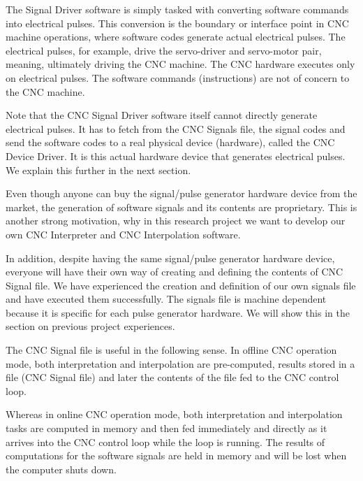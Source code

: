 The Signal Driver software is simply tasked with converting software commands into electrical pulses. This conversion is the boundary or interface point in CNC machine operations, where software codes generate actual electrical pulses. The electrical pulses, for example, drive the servo-driver and servo-motor pair, meaning, ultimately driving the CNC machine. The CNC hardware executes only on electrical pulses. The software commands (instructions) are not of concern to the CNC machine.
\vspace*{1\baselineskip}

Note that the CNC Signal Driver software itself cannot directly generate electrical pulses. It has to fetch from the CNC Signals file, the signal codes and send the software codes to a real physical device (hardware), called the CNC Device Driver. It is this actual hardware device that generates electrical pulses. We explain this further in the next section. 

\begin{tcolorbox}[colback=green!15!white,colframe=red!75!black,title=Research consideration no. 1]
\justifying
Even though anyone can buy the signal/pulse generator hardware device from the market, the generation of software signals and its contents are proprietary. This is another strong motivation, why in this research project we want to develop our own CNC Interpreter and CNC Interpolation software.   
\vspace*{1\baselineskip}

In addition, despite having the same signal/pulse generator hardware device, everyone will have their own way of creating and defining the contents of CNC Signal file. We have experienced the creation and definition of our own signals file and have executed them successfully. The signals file is machine dependent because it is specific for each pulse generator hardware. We will show this in the section on previous project experiences.
\end{tcolorbox}

The CNC Signal file is useful in the following sense. In offline CNC operation mode, both interpretation and interpolation are pre-computed, results stored in a file (CNC Signal file) and later the contents of the file fed to the CNC control loop. 
\vspace*{1\baselineskip}

Whereas in online CNC operation mode, both interpretation and interpolation tasks are computed in memory and then fed immediately and directly as it arrives into the CNC control loop while the loop is running. The results of computations for the software signals are held in memory and will be lost when the computer shuts down. 

